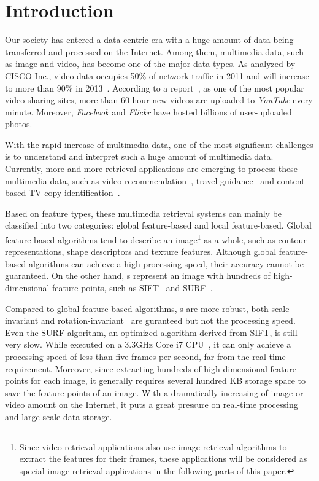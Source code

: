 \section{Introduction}
\label{sec:introduction}

Our society has entered a data-centric era with a huge amount of data being transferred and processed on the Internet. Among them, multimedia data, such as image and video, has become one of the major data types. As analyzed by CISCO Inc., video data occupies 50\% of network traffic in 2011 and will increase to more than 90\% in 2013~\cite{index2010forecast}. According to a report~\cite{jansohn2009detecting}, as one of the most popular video sharing sites, more than 60-hour new videos are uploaded to \emph{YouTube} every minute. Moreover, \emph{Facebook} and \emph{Flickr} have hosted billions of user-uploaded photos.

With the rapid increase of multimedia data, one of the most significant challenges is to understand and interpret such a huge amount of multimedia data. Currently, more and more retrieval applications are emerging to process these multimedia data, such as video recommendation~\cite{yang2007online}, travel guidance~\cite{gao2010w2go} and content-based TV copy identification~\cite{joly2003robust}.

Based on feature types, these multimedia retrieval systems can mainly be classified into two categories: global feature-based and local feature-based. Global feature-based algorithms tend to describe an image\footnote{Since video retrieval applications also use image retrieval algorithms to extract the features for their frames, these applications will be considered as special image retrieval applications in the following parts of this paper.} as a whole, such as contour representations, shape descriptors and texture features. Although global feature-based algorithms can achieve a high processing speed, their accuracy cannot be guaranteed. On the other hand, {\lfea}s represent  an image with hundreds of high-dimensional feature points, such as SIFT~\cite{lowe1999object,lowe2004distinctive} and SURF~\cite{bay2006surf,evans2009notes}.

Compared to global feature-based algorithms, {\lfea}s are more robust, both scale-invariant and rotation-invariant~\cite{mikolajczyk2005performance}\cite{bauer2007comparing} are guranteed but not the processing speed. Even the SURF algorithm, an optimized algorithm derived from SIFT, is still very slow. While executed on a 3.3GHz Core i7 CPU~\cite{chen2012adaptive}, it can only achieve a processing speed of less than five frames per second, far from the real-time requirement. Moreover, since extracting hundreds of high-dimensional feature points for each image, it generally requires several hundred KB storage space to save the feature points of an image. With a dramatically increasing of image or video amount on the Internet, it puts a great pressure on real-time processing and large-scale data storage.

